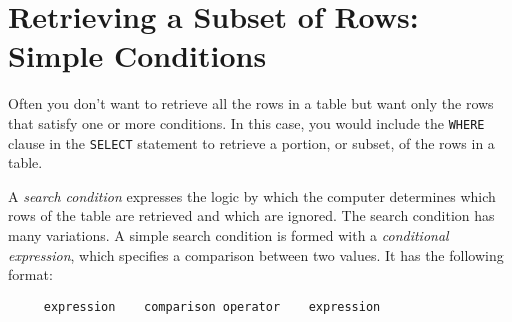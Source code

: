 %
%
%
%
%
\section{Retrieving a Subset of Rows: Simple Conditions}

Often you don't want to retrieve all the rows in a table but want only
the rows that satisfy one or more conditions.  In this case, you would
include the \verb`WHERE` clause in the \verb`SELECT` statement to retrieve a
portion, or subset, of the rows in a table.

A {\em search condition} expresses the logic by which the computer
determines which rows of the table are retrieved and which are
ignored.  The search condition has many variations.  A simple search
condition is formed with a {\em conditional expression}, which
specifies a comparison between two values.  It has the following
format:
\begin{verbatim}
     expression    comparison operator    expression
\end{verbatim}

